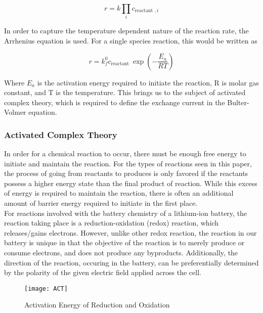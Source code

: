 \documentclass[lettersize,journal]{IEEEtran}
\begin{document}
\begin{equation}
r=k \prod_{i} c_{\text {reactant }, i}
\end{equation}

\noindent In order to capture the temperature dependent nature of the reaction rate, the Arrhenius equation is used. For a single species reaction, this would be written as

\begin{equation}
 r=k_{f}^{0} c_{\text {reactant }} \exp \left(-\frac{E_{a}}{R T}\right)
\end{equation}

\noindent Where $E_a$ is the activation energy required to initiate the reaction, R is molar gas constant, and T is the temperature. This brings us to the subject of activated complex theory, which is required to define the exchange current in the Bulter-Volmer equation.\\

\subsubsection{Activated Complex Theory}

\noindent In order for a chemical reaction to occur, there must be enough free energy to initiate and maintain the reaction. For the types of reactions seen in this paper, the process of going from reactants to produces is only favored if the reactants possess a higher energy state than the final product of reaction. While this excess of energy is required to maintain the reaction, there is often an additional amount of barrier energy required to initiate in the first place. \\

For reactions involved with the battery chemistry of a lithium-ion battery, the reaction taking place is a reduction-oxidation (redox) reaction, which releases/gains electrons. However, unlike other redox reaction, the reaction in our battery is unique in that the objective of the reaction is to merely produce or consume electrons, and does not produce any byproducts. Additionally, the direction of the reaction, occuring in the battery, can be preferentially determined by the polarity of the given electric field applied across the cell. \\

\begin{figure}[h!]
  \centering
  \texttt{[image: ACT]}
  \caption{Activation Energy of Reduction and Oxidation}
  \label{ACT_schematic}
\end{figure}
\end{document}
